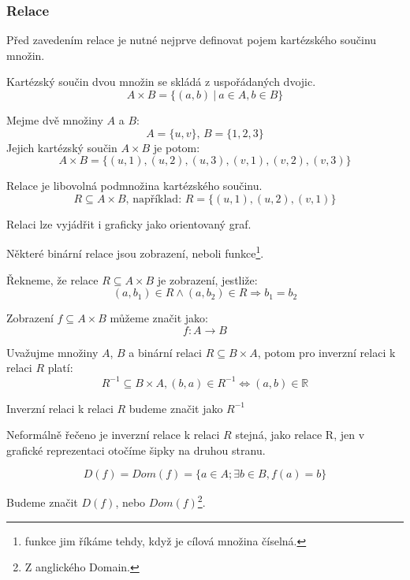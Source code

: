 \subsubsection*{Relace}
Před zavedením relace je nutné nejprve definovat pojem kartézského součinu množin.
\begin{definition} 
	Kartézský součin dvou množin se skládá z uspořádaných dvojic.
	$$A \times B = \{(a, b)\: | \: a \in A, b \in B\}$$
\end{definition}
\begin{example}
	Mejme dvě množiny $A$ a $B$:
    \[A = \{u, v\}
	\textrm{, }
	B = \{1, 2, 3\}\]
	Jejich kartézský součin $A\times B$ je potom:
	$$A \times B = \{(u, 1), (u, 2), (u, 3), (v, 1), (v, 2), (v, 3)\}$$
\end{example}

\begin{definition}[Relace]
    Relace je libovolná podmnožina kartézského součinu.
	$$R \subseteq A \times B \textrm{, například: } R = \{(u, 1), (u, 2), (v, 1)\}$$

	Relaci lze vyjádřit i graficky jako orientovaný graf.
\end{definition}


Některé binární relace jsou zobrazení, neboli funkce\footnote{funkce jim říkáme tehdy,
když je cílová množina číselná.}.

\begin{definition}[Zobrazení]
	Řekneme, že relace $R \subseteq A \times B$ je zobrazení, jestliže:
	$$(a, b_1) \in R \wedge (a, b_2) \in R \Rightarrow b_1 = b_2$$

	Zobrazení $f \subseteq A \times B$ můžeme značit jako:
	$$f: A \rightarrow B$$
\end{definition}


\begin{definition}
	Uvažujme množiny $A$, $B$ a binární relaci $R \subseteq B \times A$, potom pro
	inverzní relaci k relaci $R$ platí:
	$$R^{-1} \subseteq B \times A,  (b, a) \in R^{-1} \Leftrightarrow (a, b) \in \mathbb{R}$$

	Inverzní relaci k relaci $R$ budeme značit jako $R^{-1}$

	Neformálně řečeno je inverzní relace k relaci $R$ stejná, jako relace R,
	jen v grafické reprezentaci otočíme šipky na druhou stranu.
\end{definition}


\begin{definition}
	$$D(f) = Dom(f) = \{a \in A; \exists b \in B, f(a) = b\}$$

	Budeme značit $D(f)$, nebo $Dom(f)$\footnote{Z anglického Domain.}.
\end{definition}

